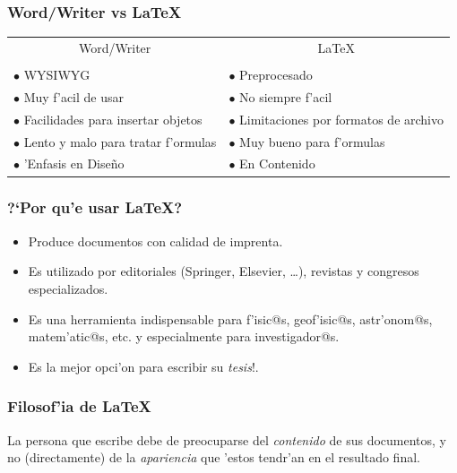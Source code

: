 \documentclass[hyperref={colorlinks}]{beamer}
\begin{document}


\begin{frame}[fragile]\frametitle{Word/Writer vs \LaTeX}
\begin{center}
\begin{tabular}{p{}p{}}
\multicolumn{1}{c}{Word/Writer	}     & \multicolumn{1}{c}{\LaTeX}      \\
\\

$\bullet$ WYSIWYG            & $\bullet$ Preprocesado          \\
$\bullet$ Muy f'acil de usar & $\bullet$ No siempre f'acil     \\
$\bullet$ Facilidades para insertar objetos 
                             & $\bullet$ Limitaciones por formatos de archivo \\[1ex]
$\bullet$ Lento y malo para tratar f'ormulas
                             & $\bullet$ Muy bueno para f'ormulas \\
$\bullet$ 'Enfasis en Dise\~no & $\bullet$ En Contenido         
\end{tabular}
\end{center}
\end{frame}

\begin{frame}[fragile]\frametitle{?`Por qu'e usar \LaTeX?}
\begin{itemize}
\item Produce documentos con calidad de imprenta.
\item Es utilizado por editoriales (Springer, Elsevier, \dots), revistas y congresos especializados.
\item Es una herramienta indispensable para f'isic@s, geof'isic@s, astr'onom@s, matem'atic@s, etc. y especialmente para investigador@s.
\item Es la mejor opci'on para escribir su \emph{tesis}!.
\end{itemize}
\end{frame}


\begin{frame}[fragile]\frametitle{Filosof'ia de \LaTeX}

\bigskip

\bigskip
\begin{block}{}
La persona que escribe debe de preocuparse del \textit{contenido} de sus documentos, y no (directamente) de la \textit{apariencia} que 'estos tendr'an en el resultado final.
\end{block}
\end{frame}
\end{document}
